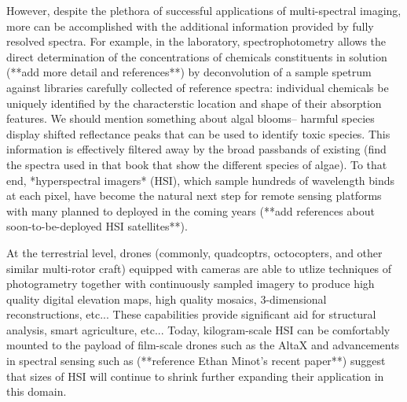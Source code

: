 \documentclass[remotesensing,article,submit,pdftex,moreauthors]{Definitions/mdpi}
\begin{document}
However, despite the plethora of successful applications of multi-spectral imaging, more can be accomplished with the additional information provided by fully resolved spectra. For example, in the laboratory, spectrophotometry allows the direct determination of the concentrations of chemicals constituents in solution (**add more detail and references**) by deconvolution of a sample spetrum against libraries carefully collected of reference spectra: individual chemicals be uniquely identified by the characterstic location and shape of their absorption features. We should mention something about algal blooms-- harmful species display shifted reflectance peaks that can be used to identify toxic species. This information is effectively filtered away by the broad passbands of existing (find the spectra used in that book that show the different species of algae). To that end, *hyperspectral imagers* (HSI), which sample hundreds of wavelength binds at each pixel, have become the natural next step for remote sensing platforms with many planned to deployed in the coming years (**add references about soon-to-be-deployed HSI satellites**). 


At the terrestrial level, drones (commonly, quadcoptrs, octocopters, and other similar multi-rotor craft) equipped with cameras are able to utlize techniques of photogrametry together with continuously sampled imagery to produce high quality digital elevation maps, high quality mosaics, 3-dimensional reconstructions, etc... These capabilities provide significant aid for structural analysis, smart agriculture, etc... Today, kilogram-scale HSI can be comfortably mounted to the payload of film-scale drones such as the AltaX and advancements in spectral sensing such as (**reference Ethan Minot's recent paper**) suggest that sizes of HSI will continue to shrink further expanding their application in this domain. 
\end{document}
